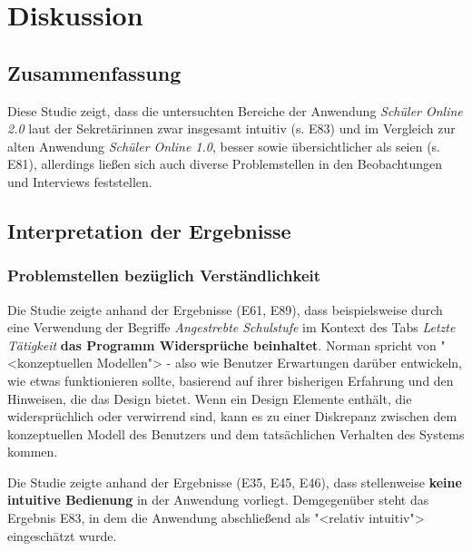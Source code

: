 \section{Diskussion}

\subsection{Zusammenfassung}
Diese Studie zeigt, dass die untersuchten Bereiche der Anwendung \textit{Schüler Online 2.0} laut der Sekretärinnen zwar insgesamt intuitiv (s. E83) und im Vergleich zur alten Anwendung \textit{Schüler Online 1.0}, \glqq besser\grqq{} sowie \glqq übersichtlicher \grqq{} als seien (s. E81), allerdings ließen sich auch diverse Problemstellen in den Beobachtungen und Interviews feststellen. 

%

\subsection{Interpretation der Ergebnisse}

\subsubsection{Problemstellen bezüglich Verständlichkeit}

Die Studie zeigte anhand der Ergebnisse (E61, E89), dass beispielsweise durch eine Verwendung der Begriffe \textit{Angestrebte Schulstufe} im Kontext des Tabs \textit{Letzte Tätigkeit} \textbf{das Programm Widersprüche beinhaltet}. Norman spricht von "<konzeptuellen Modellen"> - also wie Benutzer Erwartungen darüber entwickeln, wie etwas funktionieren sollte, basierend auf ihrer bisherigen Erfahrung und den Hinweisen, die das Design bietet. Wenn ein Design Elemente enthält, die widersprüchlich oder verwirrend sind, kann es zu einer Diskrepanz zwischen dem konzeptuellen Modell des Benutzers und dem tatsächlichen Verhalten des Systems kommen. 

Die Studie zeigte anhand der Ergebnisse (E35, E45, E46), dass stellenweise \textbf{keine intuitive Bedienung} in der Anwendung vorliegt. Demgegenüber steht das Ergebnis E83, in dem die Anwendung abschließend als "<relativ intuitiv"> eingeschätzt wurde.


